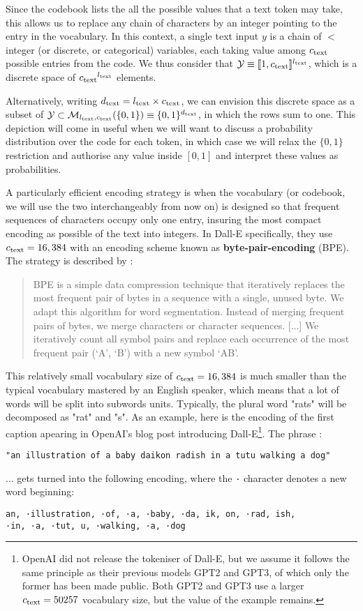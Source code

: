 \documentclass{article}
\begin{document}
\begin{appendix}
Since the codebook lists the all the possible values that a text token may take, this allows us to replace any chain of characters by an integer pointing to the entry in the vocabulary. 
In this context, a single text input $y$ is a chain of $\lt$ integer (or discrete, or categorical) variables, each taking value among ${c_{\mathrm{text}}}$ possible entries from the code.
We thus consider that $\mathcal{Y}\equiv [\![1,{c_{\mathrm{text}}} ]\!]^{{l_{\mathrm{text}}}}$, which is a discrete space of ${c_{\mathrm{text}}}^{l_{\mathrm{text}}}$ elements. 

Alternatively, writing ${d_{\mathrm{text}}} = {l_{\mathrm{text}}} \times {c_{\mathrm{text}}}$, we can envision this discrete space as a subset of $\mathcal{Y} \subset \mathcal{M}_{{l_{\mathrm{text}}},{c_{\mathrm{text}}}}(\{0,1\})\equiv \{0,1\}^{d_{\mathrm{text}}}$, in which the rows sum to one.
This depiction will come in useful when we will want to discuss a probability distribution over the code for each token, in which case we will relax the $\{0,1\}$ restriction and authorise any value inside $[0,1]$ and interpret these values as probabilities.

A particularly efficient encoding strategy is when the vocabulary (or codebook, we will use the two interchangeably from now on) is designed so that frequent sequences of characters occupy only one entry, insuring the most compact encoding as possible of the text into integers.
In Dall-E specifically, they use ${c_{\mathrm{text}}}=16,384$ with an encoding scheme known as \textbf{byte-pair-encoding} (BPE). The strategy is described by \citet{subword-units}:

\blockquote{
BPE is a simple data compression technique that iteratively replaces the most frequent pair of bytes in a sequence with a single, unused byte.
We adapt this algorithm for word segmentation.
Instead of merging frequent pairs of bytes, we merge characters or character sequences.
[...]
We iteratively count all symbol pairs and replace each occurrence of the most frequent pair (‘A’, ‘B’) with a new symbol ‘AB’.
}

This relatively small vocabulary size of ${c_{\mathrm{text}}}=16,384$ is much smaller than the typical vocabulary mastered by an English speaker, which means that a lot of words will be split into subwords units. Typically, the plural word "rats" will be decomposed as "rat" and "s". As an example, here is the encoding of the first caption apearing in OpenAI's blog post introducing Dall-E\footnote{OpenAI did not release the tokeniser of Dall-E, but we assume it follows the same principle as their previous models GPT2 and GPT3, of which only the former has been made public. Both GPT2 and GPT3 use a larger ${c_{\mathrm{text}}}=50257$ vocabulary size, but the value of the example remains.}. The phrase :
\begin{verbatim}
"an illustration of a baby daikon radish in a tutu walking a dog"
\end{verbatim}
... gets turned into the following encoding, where the \verb+·+ character denotes a new word beginning:
\begin{verbatim}
an, ·illustration, ·of, ·a, ·baby, ·da, ik, on, ·rad, ish,
·in, ·a, ·tut, u, ·walking, ·a, ·dog
\end{verbatim}


\end{appendix}
\end{document}
